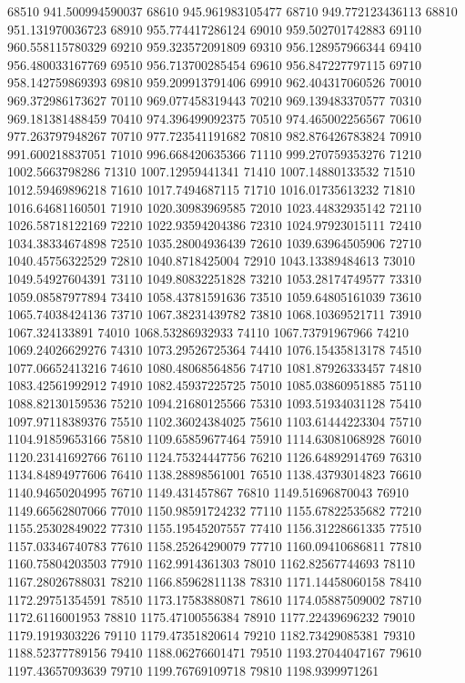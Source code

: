 {68510 941.500994590037
68610 945.961983105477
68710 949.772123436113
68810 951.131970036723
68910 955.774417286124
69010 959.502701742883
69110 960.558115780329
69210 959.323572091809
69310 956.128957966344
69410 956.480033167769
69510 956.713700285454
69610 956.847227797115
69710 958.142759869393
69810 959.209913791406
69910 962.404317060526
70010 969.372986173627
70110 969.077458319443
70210 969.139483370577
70310 969.181381488459
70410 974.396499092375
70510 974.465002256567
70610 977.263797948267
70710 977.723541191682
70810 982.876426783824
70910 991.600218837051
71010 996.668420635366
71110 999.270759353276
71210 1002.5663798286
71310 1007.12959441341
71410 1007.14880133532
71510 1012.59469896218
71610 1017.7494687115
71710 1016.01735613232
71810 1016.64681160501
71910 1020.30983969585
72010 1023.44832935142
72110 1026.58718122169
72210 1022.93594204386
72310 1024.97923015111
72410 1034.38334674898
72510 1035.28004936439
72610 1039.63964505906
72710 1040.45756322529
72810 1040.8718425004
72910 1043.13389484613
73010 1049.54927604391
73110 1049.80832251828
73210 1053.28174749577
73310 1059.08587977894
73410 1058.43781591636
73510 1059.64805161039
73610 1065.74038424136
73710 1067.38231439782
73810 1068.10369521711
73910 1067.324133891
74010 1068.53286932933
74110 1067.73791967966
74210 1069.24026629276
74310 1073.29526725364
74410 1076.15435813178
74510 1077.06652413216
74610 1080.48068564856
74710 1081.87926333457
74810 1083.42561992912
74910 1082.45937225725
75010 1085.03860951885
75110 1088.82130159536
75210 1094.21680125566
75310 1093.51934031128
75410 1097.97118389376
75510 1102.36024384025
75610 1103.61444223304
75710 1104.91859653166
75810 1109.65859677464
75910 1114.63081068928
76010 1120.23141692766
76110 1124.75324447756
76210 1126.64892914769
76310 1134.84894977606
76410 1138.28898561001
76510 1138.43793014823
76610 1140.94650204995
76710 1149.431457867
76810 1149.51696870043
76910 1149.66562807066
77010 1150.98591724232
77110 1155.67822535682
77210 1155.25302849022
77310 1155.19545207557
77410 1156.31228661335
77510 1157.03346740783
77610 1158.25264290079
77710 1160.09410686811
77810 1160.75804203503
77910 1162.9914361303
78010 1162.82567744693
78110 1167.28026788031
78210 1166.85962811138
78310 1171.14458060158
78410 1172.29751354591
78510 1173.17583880871
78610 1174.05887509002
78710 1172.6116001953
78810 1175.47100556384
78910 1177.22439696232
79010 1179.1919303226
79110 1179.47351820614
79210 1182.73429085381
79310 1188.52377789156
79410 1188.06276601471
79510 1193.27044047167
79610 1197.43657093639
79710 1199.76769109718
79810 1198.9399971261
}

